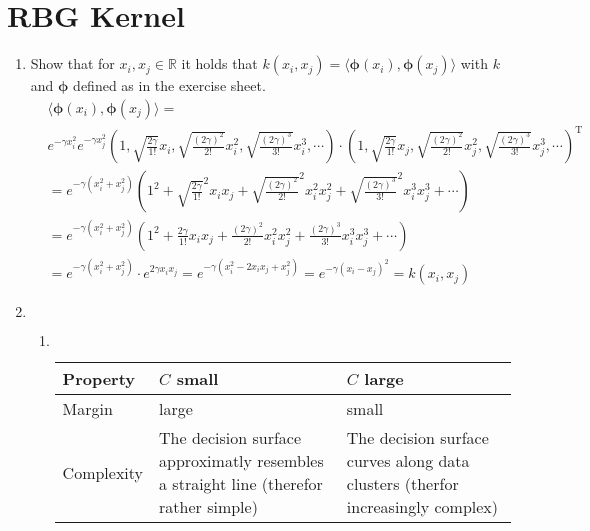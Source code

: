 \documentclass[DIN, pagenumber=false, fontsize=11pt, parskip=half]{scrartcl}
\newcommand{\R}[0]{\mathbb{R}}
\begin{document}
    \section{RBG Kernel}
    \begin{enumerate}
        \item
        Show that for $x_i, x_j \in \R$ it holds that $k(x_i, x_j) = \langle \bm{\phi}(x_i), \bm{\phi}(x_j) \rangle$
        with $k$ and $\bm{\phi}$ defined as in the exercise sheet.
        \begin{align*}
             &\langle \bm{\phi}(x_i), \bm{\phi}(x_j) \rangle = \\
             &e^{-\gamma x_i^2} e^{-\gamma x_j^2}
             \left( 1, \sqrt{\frac{2 \gamma}{1!}} x_i, \sqrt{\frac{(2 \gamma)^2}{2!}} x_i^2,
             \sqrt{\frac{(2 \gamma)^3}{3!}} x_i^3, \cdots \right) \cdot
             \left( 1, \sqrt{\frac{2 \gamma}{1!}} x_j, \sqrt{\frac{(2 \gamma)^2}{2!}} x_j^2,
             \sqrt{\frac{(2 \gamma)^3}{3!}} x_j^3, \cdots \right)^\text{T} \\
             &= e^{-\gamma (x_i^2 + x_j^2)} \left( 1^2 + \sqrt{\frac{2 \gamma}{1!}}^2 x_i x_j
             + \sqrt{\frac{(2 \gamma)^2}{2!}}^2 x_i^2 x_j^2 + \sqrt{\frac{(2 \gamma)^3}{3!}}^2
             x_i^3 x_j^3 + \cdots \right) \\
             &= e^{-\gamma (x_i^2 +  x_j^2)} \left( 1^2 + \frac{2 \gamma}{1!} x_i x_j
             + \frac{(2 \gamma)^2}{2!} x_i^2 x_j^2 + \frac{(2 \gamma)^3}{3!} x_i^3 x_j^3
             + \cdots \right) \\
             &= e^{-\gamma (x_i^2 +  x_j^2)} \cdot e^{2 \gamma x_i x_j}
             = e^{-\gamma (x_i^2 - 2 x_i x_j + x_j^2)} = e^{-\gamma (x_i - x_j)^2} = k(x_i, x_j)
        \end{align*}
        \item
        $ $
        \begin{enumerate}
            \item
            $ $
            \begin{table}[H]
                \centering
                \begin{tabularx}{\textwidth}{l|X|X}
                    \toprule
                    Property & $C$ small & $C$ large \\
                    \midrule
                    Margin & large & small \\
                    Complexity & The decision surface approximatly resembles a straight line (therefor rather simple) &
                    The decision surface curves along data clusters (therfor increasingly complex)\\

\end{tabularx}
\end{table}
\end{enumerate}
\end{enumerate}
\end{document}
